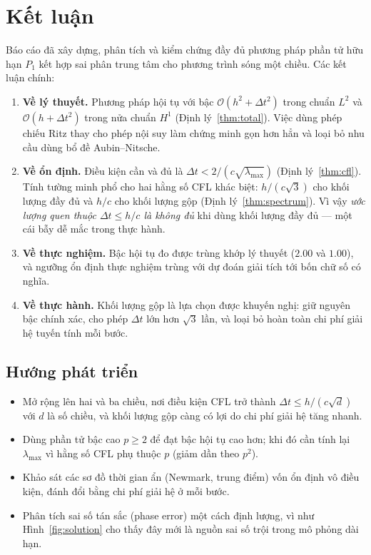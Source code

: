 \documentclass[11pt,a4paper]{article}
\theoremstyle{plain}
\theoremstyle{definition}
\theoremstyle{remark}
\newcommand{\Hone}{H^{1}}
\newcommand{\Ltwo}{L^{2}}
\newcommand{\dt}{\Delta t}
\newcommand{\lammax}{\lambda_{\max}}
\begin{document}
\section{Kết luận}
\label{sec:ketluan}

Báo cáo đã xây dựng, phân tích và kiểm chứng đầy đủ phương pháp phần tử hữu
hạn $P_{1}$ kết hợp sai phân trung tâm cho phương trình sóng một chiều. Các
kết luận chính:

\begin{enumerate}
  \item \textbf{Về lý thuyết.} Phương pháp hội tụ với bậc
        $\mathcal{O}(h^{2} + \dt^{2})$ trong chuẩn $\Ltwo$ và
        $\mathcal{O}(h + \dt^{2})$ trong nửa chuẩn $\Hone$
        (Định lý~\ref{thm:total}). Việc dùng phép chiếu Ritz thay cho phép nội suy
        làm chứng minh gọn hơn hẳn và loại bỏ nhu cầu dùng bổ đề
        Aubin--Nitsche.
  \item \textbf{Về ổn định.} Điều kiện cần và đủ là
        $\dt < 2/(c\sqrt{\lammax})$ (Định lý~\ref{thm:cfl}). Tính tường minh phổ
        cho hai hằng số CFL khác biệt: $h/(c\sqrt{3})$ cho khối lượng đầy đủ
        và $h/c$ cho khối lượng gộp (Định lý~\ref{thm:spectrum}). Vì vậy
        \emph{ước lượng quen thuộc $\dt \le h/c$ là không đủ} khi dùng khối
        lượng đầy đủ --- một cái bẫy dễ mắc trong thực hành.
  \item \textbf{Về thực nghiệm.} Bậc hội tụ đo được trùng khớp lý thuyết
        ($2.00$ và $1.00$), và ngưỡng ổn định thực nghiệm trùng với dự đoán
        giải tích tới bốn chữ số có nghĩa.
  \item \textbf{Về thực hành.} Khối lượng gộp là lựa chọn được khuyến nghị:
        giữ nguyên bậc chính xác, cho phép $\dt$ lớn hơn $\sqrt{3}$ lần, và
        loại bỏ hoàn toàn chi phí giải hệ tuyến tính mỗi bước.
\end{enumerate}

\subsection*{Hướng phát triển}

\begin{itemize}
  \item Mở rộng lên hai và ba chiều, nơi điều kiện CFL trở thành
        $\dt \le h/(c\sqrt{d})$ với $d$ là số chiều, và khối lượng gộp càng
        có lợi do chi phí giải hệ tăng nhanh.
  \item Dùng phần tử bậc cao $p \ge 2$ để đạt bậc hội tụ cao hơn; khi đó cần
        tính lại $\lammax$ vì hằng số CFL phụ thuộc $p$ (giảm dần theo
        $p^{2}$).
  \item Khảo sát các sơ đồ thời gian ẩn (Newmark, trung điểm) vốn ổn định vô
        điều kiện, đánh đổi bằng chi phí giải hệ ở mỗi bước.
  \item Phân tích sai số tán sắc (phase error) một cách định lượng, vì như
        Hình~\ref{fig:solution} cho thấy đây mới là nguồn sai số trội trong mô
        phỏng dài hạn.
\end{itemize}
\end{document}
